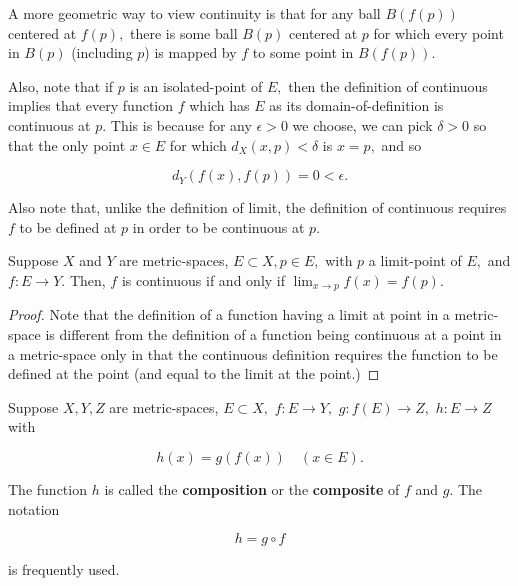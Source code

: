 \documentclass{article}
\begin{document}
\begin{note}
A more geometric way to view continuity is that for any \@{ball} $B(f(p))$ centered at $f(p),$ there is some \@{ball} $B(p)$ centered at $p$ for which every point in $B(p)$ (including $p$) is mapped by $f$ to some point in $B(f(p)).$

Also, note that if $p$ is an \@{isolated-point} of $E,$ then the definition of \@{continuous} implies that every \@{function} $f$ which has $E$ as its \@{domain-of-definition} is \@{continuous} at $p.$ This is because for any $\epsilon > 0$ we choose, we can pick $\delta > 0$ so that the only point $x \in E$ for which $d_X(x, p) < \delta$ is $x = p,$ and so

\[ d_Y(f(x), f(p)) = 0 < \epsilon. \]

Also note that, unlike the definition of \@{limit}, the definition of \@{continuous} requires $f$ to be defined at $p$ in order to be \@{continuous} at $p.$
\end{note}

\begin{theorem}\label{function-is-continuous-at-point-iff-limit-at-point-equals-function-at-point}
Suppose $X$ and $Y$ are \@{metric-spaces}, $E \subset X, p \in E,$ with $p$ a \@{limit-point} of $E,$ and $f : E \to Y.$ Then, $f$ is \@{continuous} if and only if $\lim_{x \to p} f(x) = f(p).$
\end{theorem}

\begin{proof}
Note that the definition of a \@{function} having a \@{limit} at \@{point} in a \@{metric-space} is different from the definition of a \@{function} being \@{continuous} at a \@{point} in a \@{metric-space} only in that the \@{continuous} definition requires the \@{function} to be defined at the \@{point} (and equal to the \@{limit} at the \@{point}.)
\end{proof}

\begin{definition}[Composition]
Suppose $X, Y, Z$ are \@{metric-spaces}, $E \subset X,$ $f: E \to Y,$ $g: f(E) \to Z,$ $h: E \to Z$ with

\[ h(x) = g(f(x)) \quad (x \in E). \]

The \@{function} $h$ is called the \textbf{composition} or the \textbf{composite} of $f$ and $g.$ The notation

\[ h = g \circ f \]

is frequently used.
\end{definition}
\end{document}
